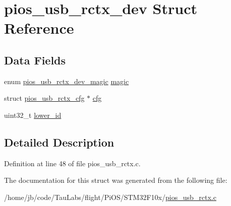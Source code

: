 \hypertarget{structpios__usb__rctx__dev}{\section{pios\-\_\-usb\-\_\-rctx\-\_\-dev \-Struct \-Reference}
\label{structpios__usb__rctx__dev}
}
\subsection*{\-Data \-Fields}
\begin{DoxyCompactItemize}
\item 
enum \hyperlink{group___p_i_o_s___u_s_b___r_c_t_x_gab6be8817fc2ea56ea36728686255d0dc}{pios\-\_\-usb\-\_\-rctx\-\_\-dev\-\_\-magic} \hyperlink{group___p_i_o_s___u_s_b___r_c_t_x_ga8f71b1caefbf4e9ed2a032bd56d63c73}{magic}
\item 
struct \hyperlink{structpios__usb__rctx__cfg}{pios\-\_\-usb\-\_\-rctx\-\_\-cfg} $\ast$ \hyperlink{group___p_i_o_s___u_s_b___r_c_t_x_gafd4556f7f9de22ef19636d97457b59b5}{cfg}
\item 
uint32\-\_\-t \hyperlink{group___p_i_o_s___u_s_b___r_c_t_x_gab5b742c93aa7545ca0a497ffb8b0c298}{lower\-\_\-id}
\end{DoxyCompactItemize}


\subsection{\-Detailed \-Description}


\-Definition at line 48 of file pios\-\_\-usb\-\_\-rctx.\-c.



\-The documentation for this struct was generated from the following file\-:\begin{DoxyCompactItemize}
\item 
/home/jb/code/\-Tau\-Labs/flight/\-Pi\-O\-S/\-S\-T\-M32\-F10x/\hyperlink{pios__usb__rctx_8c}{pios\-\_\-usb\-\_\-rctx.\-c}\end{DoxyCompactItemize}
